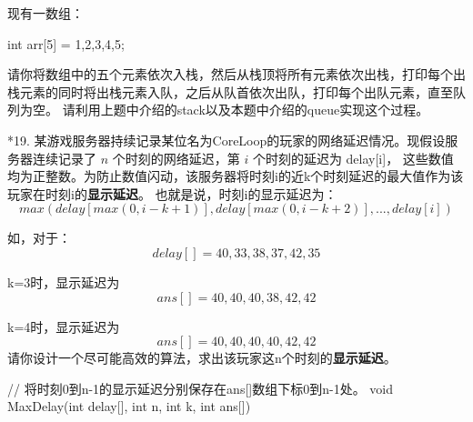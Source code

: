     现有一数组：
    \begin{cppcode}
        int arr[5] = {1,2,3,4,5};
    \end{cppcode}
    请你将数组中的五个元素依次入栈，然后从栈顶将所有元素依次出栈，打印每个出栈元素的同时将出栈元素入队，之后从队首依次出队，打印每个出队元素，直至队列为空。
    请利用上题中介绍的stack以及本题中介绍的queue实现这个过程。

    \vspace{\baselineskip}


    *19. 某游戏服务器持续记录某位名为CoreLoop的玩家的网络延迟情况。现假设服务器连续记录了 \(n\) 个时刻的网络延迟，第 \(i\) 个时刻的延迟为 delay[i]，
    这些数值均为正整数。为防止数值闪动，该服务器将时刻i的近k个时刻延迟的最大值作为该玩家在时刻i的\textbf{显示延迟}。
    也就是说，时刻i的显示延迟为：
    \[
        max(delay[max(0, i-k+1)], delay[max(0, i-k+2)], ..., delay[i])
    \]

    如，对于：
    \[
        delay[] = {40, 33, 38, 37, 42, 35}
    \]

    k=3时，显示延迟为
    \[
        ans[]   = {40, 40, 40, 38, 42, 42}
    \]

    k=4时，显示延迟为
    \[
        ans[]   = {40, 40, 40, 40, 42, 42}
    \]
    请你设计一个尽可能高效的算法，求出该玩家这n个时刻的\textbf{显示延迟}。
    \begin{cppcode}
    // 将时刻0到n-1的显示延迟分别保存在ans[]数组下标0到n-1处。
        void MaxDelay(int delay[], int n, int k, int ans[]) {

        }
    \end{cppcode}



